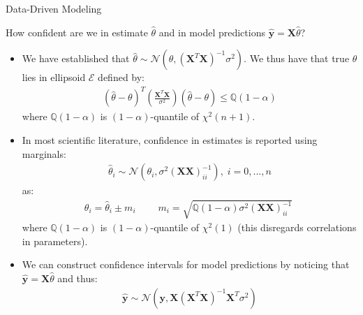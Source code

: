 \documentclass[9pt]{beamer}
\begin{document}
%
\begin{frame}{Data-Driven Modeling}

\begin{block}{}
How confident are we in estimate $\hat{\theta}$ and in model predictions $\hat{\mathbf{y}}=\mathbf{X}\hat{\theta}$?
\end{block}
\begin{itemize}
\setlength{\itemsep}{5pt}
\item We have established that $\hat{\theta}\sim\mathcal{N}(\theta,(\mathbf{X}^T\mathbf{X})^{-1}\sigma^2)$.  We thus have that true $\theta$ lies in ellipsoid $\mathcal{E}$ defined by:
\begin{align*}
(\hat{\theta}-\theta)^T\left(\frac{\mathbf{X}^T\mathbf{X}}{\sigma^2}\right)(\hat{\theta}-\theta)\leq \mathbb{Q}(1-\alpha)
\end{align*}
where $\mathbb{Q}(1-\alpha)$ is $(1-\alpha)$-quantile of $\chi^2(n+1)$.  

\item In most scientific literature, confidence in estimates is reported using marginals:
\begin{align*}
\hat{\theta}_i\sim \mathcal{N}(\theta_i,\sigma^2(\mathbf{X}\mathbf{X})^{-1}_{ii}),\; i=0,...,n
\end{align*}
as:
\begin{align*}
\theta_i=\hat{\theta}_i\pm m_i\;\qquad m_i=\sqrt{\mathbb{Q}(1-\alpha)\sigma^2(\mathbf{X}\mathbf{X})^{-1}_{ii}}\;
\end{align*}
where  $\mathbb{Q}(1-\alpha)$ is $(1-\alpha)$-quantile of $\chi^2(1)$ (this disregards correlations in parameters). 
\item We can construct confidence intervals for model predictions by noticing that $\mathbf{\hat{y}}=\mathbf{X}\hat{\theta}$ and thus:
\begin{align*}
\hat{\mathbf{y}}\sim \mathcal{N}(\mathbf{y},\mathbf{X}(\mathbf{X}^T\mathbf{X})^{-1}\mathbf{X}^T\sigma^2)
\end{align*} 
\end{itemize}
\end{frame}
\end{document}
